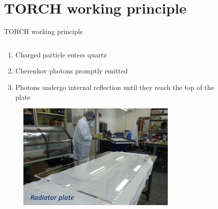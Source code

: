 \documentclass[xcolor={dvipsnames}]{beamer}
\begin{document}
\section{TORCH working principle}
\begin{frame}{TORCH working principle}
  \begin{columns}
    \begin{column}{0.60\textwidth}
      \begin{enumerate}
        \setlength\itemsep{1.0em}
        \item{Charged particle enters quartz}
        \item{Cherenkov photons promptly emitted}
        \item{Photons undergo internal reflection until they reach the top of the plate}
      \end{enumerate}
      \begin{figure}
        \centering
        \includegraphics[width = 0.8\textwidth]{Figs/RadiatorPlate_lab.png}
      \end{figure}
    \end{column}
    \begin{column}{0.40\textwidth}
      \begin{figure}
        \centering

\end{figure}
\end{column}
\end{columns}
\end{frame}
\end{document}
